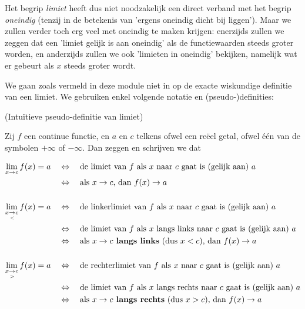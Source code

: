 \documentclass[numbers]{ximera}
\begin{document}
 Het begrip \textit{limiet} heeft dus niet noodzakelijk een direct verband met het begrip \textit{oneindig} (tenzij in de betekenis van 'ergens oneindig dicht bij liggen'). Maar we zullen verder toch erg veel met oneindig te maken krijgen: enerzijds zullen we zeggen dat een 'limiet gelijk is aan oneindig' als de functiewaarden steeds groter worden, en anderzijds zullen we ook 'limieten in oneindig' bekijken, namelijk wat er gebeurt als $x$ steeds groter wordt.


We gaan zoals vermeld in deze module niet in op de exacte wiskundige definitie van een limiet. We gebruiken enkel volgende notatie en (pseudo-)definities:

\begin{definition} (Intuïtieve pseudo-definitie van limiet)
	
	Zij $f$ een continue functie, en $a$ en $c$ telkens ofwel een reëel getal, ofwel één van de symbolen $+\infty$ of $-\infty$. 
	Dan zeggen en schrijven we dat 

\begin{align*}
	\limxc  f(x) = a & \quad\iff\quad \text{de limiet van $f$ als $x$ naar $c$ gaat is (gelijk aan) $a$} \\
	                   & \quad\iff\quad \text{als }x\to c\text{, dan } 									f(x) \to a \\
	                   \\
	\llimxc f(x) = a & \quad\iff\quad \text{de linkerlimiet van $f$ als $x$ naar $c$ gaat is (gelijk aan) $a$} \\
	                   & \quad\iff\quad \text{de limiet van $f$ als $x$ langs links naar $c$ gaat is (gelijk aan) $a$} \\
	                   & \quad\iff\quad \text{als }x\to c\text{\textbf{ langs links} (dus $x<c$), dan } f(x) \to a \\
	                   \\
	\rlimxc f(x) = a & \quad\iff\quad \text{de rechterlimiet van $f$ als $x$ naar $c$ gaat is (gelijk aan) $a$} \\
					   & \quad\iff\quad \text{de limiet van $f$ als $x$ langs rechts naar $c$ gaat is (gelijk aan) $a$} \\
					   & \quad\iff\quad \text{als }x\to c\text{\textbf{ langs rechts} (dus $x>c$), dan }f(x) \to a 
\end{align*}

\end{definition}
\end{document}
